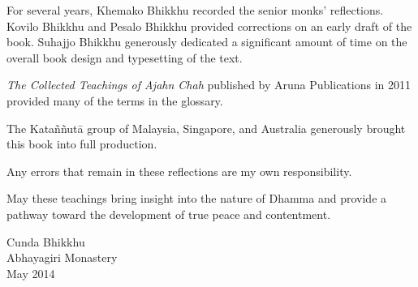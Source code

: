 For several years, Khemako Bhikkhu recorded the senior monks'
reflections. Kovilo Bhikkhu and Pesalo Bhikkhu provided corrections on
an early draft of the book. Suhajjo Bhikkhu generously dedicated a
significant amount of time on the overall book design and typesetting of
the text.


\textit{The Collected Teachings of Ajahn Chah} published by Aruna
Publications in 2011 provided many of the terms in the glossary. 

The Kataññutā group of Malaysia, Singapore, and Australia generously
brought this book into full production.

Any errors that remain in these reflections are my own responsibility.

May these teachings bring insight into the nature of Dhamma and provide
a pathway toward the development of true peace and contentment.


{\raggedleft
Cunda Bhikkhu\\Abhayagiri Monastery\\May 2014

}
